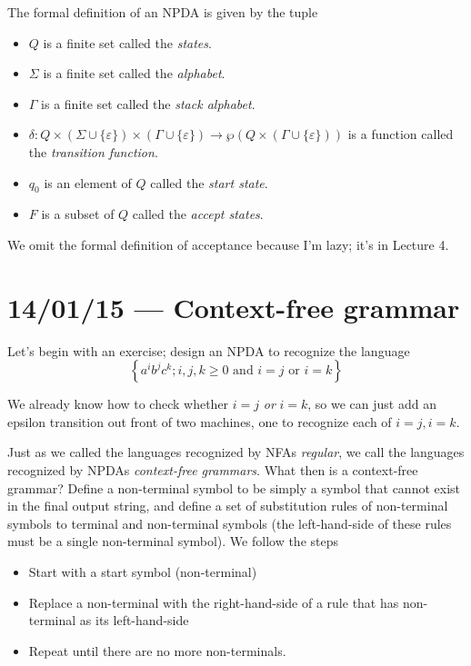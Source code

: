 \documentclass[10pt]{report}
\begin{document}
The formal definition of an NPDA is given by the tuple
\begin{itemize}
    \item $Q$ is a finite set called the \emph{states}.
    \item $\Sigma$ is a finite set called the \emph{alphabet}.
    \item $\Gamma$ is a finite set called the \emph{stack alphabet}.
    \item $\delta: Q \times (\Sigma \cup \{\varepsilon\}) \times (\Gamma \cup \{\varepsilon\}) \to \wp(Q \times (\Gamma \cup \{\varepsilon\}))$ is a function called the \emph{transition function}.
    \item $q_0$ is an element of $Q$ called the \emph{start state}.
    \item $F$ is a subset of $Q$ called the \emph{accept states}.
\end{itemize}

We omit the formal definition of acceptance because I'm lazy; it's in Lecture 4. 

\chapter{14/01/15 --- Context-free grammar}

Let's begin with an exercise; design an NPDA to recognize the language 
$$\left\{ a^ib^jc^k; i,j,k \geq 0 \text{ and } i=j \text{ or } i=k \right\}$$

We already know how to check whether $i=j$ \emph{or} $i=k$, so we can just add an epsilon transition out front of two machines, one to recognize each of $i=j, i=k$.

Just as we called the languages recognized by NFAs \emph{regular}, we call the languages recognized by NPDAs \emph{context-free grammars}. What then is a context-free grammar? Define a non-terminal symbol to be simply a symbol that cannot exist in the final output string, and define a set of substitution rules of non-terminal symbols to terminal and non-terminal symbols (the left-hand-side of these rules must be a single non-terminal symbol). We follow the steps
\begin{itemize}
    \item Start with a start symbol (non-terminal)
    \item Replace a non-terminal with the right-hand-side of a rule that has non-terminal as its left-hand-side
    \item Repeat until there are no more non-terminals.
\end{itemize}
\end{document}
